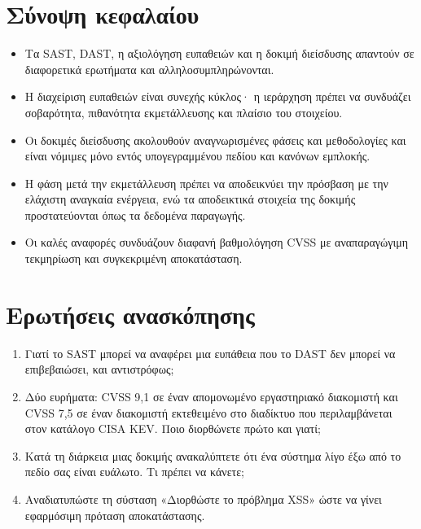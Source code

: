 \section*{Σύνοψη κεφαλαίου}
\begin{itemize}
  \item Τα SAST, DAST, η αξιολόγηση ευπαθειών και η δοκιμή διείσδυσης απαντούν σε διαφορετικά ερωτήματα και αλληλοσυμπληρώνονται.
  \item Η διαχείριση ευπαθειών είναι συνεχής κύκλος· η ιεράρχηση πρέπει να συνδυάζει σοβαρότητα, πιθανότητα εκμετάλλευσης και πλαίσιο του στοιχείου.
  \item Οι δοκιμές διείσδυσης ακολουθούν αναγνωρισμένες φάσεις και μεθοδολογίες και είναι νόμιμες μόνο εντός υπογεγραμμένου πεδίου και κανόνων εμπλοκής.
  \item Η φάση μετά την εκμετάλλευση πρέπει να αποδεικνύει την πρόσβαση με την ελάχιστη αναγκαία ενέργεια, ενώ τα αποδεικτικά στοιχεία της δοκιμής προστατεύονται όπως τα δεδομένα παραγωγής.
  \item Οι καλές αναφορές συνδυάζουν διαφανή βαθμολόγηση CVSS με αναπαραγώγιμη τεκμηρίωση και συγκεκριμένη αποκατάσταση.
\end{itemize}

\section*{Ερωτήσεις ανασκόπησης}
\begin{enumerate}
  \item Γιατί το SAST μπορεί να αναφέρει μια ευπάθεια που το DAST δεν μπορεί να επιβεβαιώσει, και αντιστρόφως;
  \item Δύο ευρήματα: CVSS 9,1 σε έναν απομονωμένο εργαστηριακό διακομιστή και CVSS 7,5 σε έναν διακομιστή εκτεθειμένο στο διαδίκτυο που περιλαμβάνεται στον κατάλογο CISA KEV. Ποιο διορθώνετε πρώτο και γιατί;
  \item Κατά τη διάρκεια μιας δοκιμής ανακαλύπτετε ότι ένα σύστημα λίγο έξω από το πεδίο σας είναι ευάλωτο. Τι πρέπει να κάνετε;
  \item Αναδιατυπώστε τη σύσταση «Διορθώστε το πρόβλημα XSS» ώστε να γίνει εφαρμόσιμη πρόταση αποκατάστασης.
\end{enumerate}
